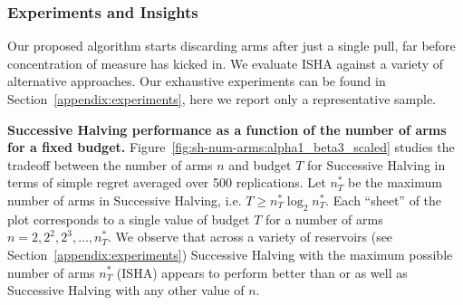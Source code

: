 \subsubsection{Experiments and Insights}\label{fb-experiments}
Our proposed algorithm starts discarding arms after just a single pull, far before concentration of measure has kicked in. 
We evaluate ISHA against a variety of alternative approaches. Our exhaustive experiments can be found in Section~\ref{appendix:experiments}, here we report only a representative sample.

\textbf{Successive Halving performance as a function of the number of arms for a fixed budget.}
Figure~\ref{fig:sh-num-arms:alpha1_beta3_scaled} studies the tradeoff between the number of arms $n$ and budget $T$ for Successive Halving in terms of simple regret averaged over 500 replications. Let $n^*_T$ be the maximum number of arms in Successive Halving,
i.e. $T \geq n^*_T \log_2 n^*_T$.
Each ``sheet'' of the plot corresponds to a single value of budget $T$ for a number of arms $n=2,2^2,2^3,\dots,n^*_T$.
We observe that across a variety of reservoirs (see Section~\ref{appendix:experiments}) Successive Halving with the maximum possible number of arms $n^*_T$ (ISHA) appears to perform better than or as well as Successive Halving with any other value of $n$.


